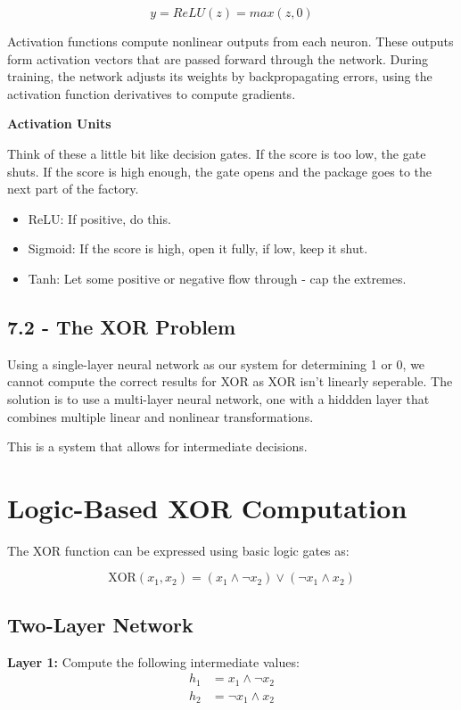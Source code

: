 \documentclass{article}
\begin{document}
\[
    y = ReLU(z) = max(z,0)
\]

Activation functions compute nonlinear outputs from each neuron. These outputs form activation vectors that are passed forward through the network. During training, the network adjusts its weights by backpropagating errors, using the activation function derivatives to compute gradients.

\textbf{Activation Units}

Think of these a little bit like decision gates. If the score is too low, the gate shuts. If the score is high enough, the gate opens and the package goes
to the next part of the factory.

\begin{itemize}
    \item ReLU: If positive, do this.
    \item Sigmoid: If the score is high, open it fully, if low, keep it shut.
    \item Tanh: Let some positive or negative flow through - cap the extremes.
\end{itemize}


\subsection{7.2 - The XOR Problem}

Using a single-layer neural network as our system for determining 1 or 0, we cannot compute the correct results for
XOR as XOR isn't linearly seperable. The solution is to use a multi-layer neural network, one with a hiddden layer that combines multiple linear and nonlinear transformations.

This is a system that allows for intermediate decisions. \newline


\section*{Logic-Based XOR Computation}

The XOR function can be expressed using basic logic gates as:

\[
    \text{XOR}(x_1, x_2) = (x_1 \land \neg x_2) \lor (\neg x_1 \land x_2)
\]

\subsection*{Two-Layer Network}

\textbf{Layer 1:} Compute the following intermediate values:
\[
    \begin{aligned}
        h_1 & = x_1 \land \neg x_2 \\
        h_2 & = \neg x_1 \land x_2
    \end{aligned}
\]
\end{document}
